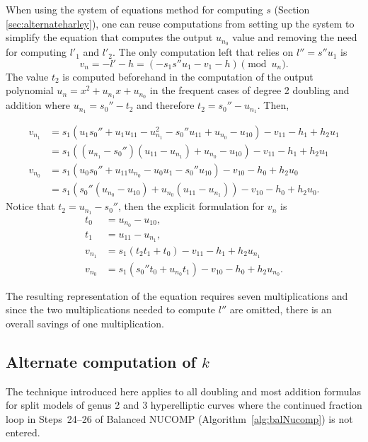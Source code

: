 When using the system of equations method for computing $s$ (Section
\ref{sec:alternateharley}), one can reuse computations from setting up the
system to simplify the equation that computes the output $u_{n_0}$ value and
removing the need for computing $l'_1$ and $l'_2$. The only computation left
that relies on $l'' = s''u_1$ is $$ v_n = -l' - h = (-s_1s''u_1 - v_1 - h)
\pmod{u_n}. $$ The value $t_2$ is computed beforehand in the computation of the
output polynomial $u_n = x^2 + u_{n_1}x + u_{n_0}$ in the frequent cases of
degree 2 doubling and addition where $u_{n_1} = s_0'' - t_2$ and therefore
$t_2 = s_0'' - u_{n_1}$. Then,

\begin{align*}
    v_{n_1} &= s_1(u_1s_0''+ u_1u_{11} - u_{n_1}^2 - s_0''u_{11}
    + u_{n_0} - u_{10}) - v_{11} - h_1 + h_2u_1\\
            &= s_1((u_{n_1} - s_0'')(u_{11} - u_{n_1}) + u_{n_0} - u_{10}) - v_{11} - h_1 + h_2u_1\\
    v_{n_0} &= s_1(u_0s_0'' + u_{11}u_{n_0} - u_0u_1 -s_0''u_{10}) - v_{10} - h_0 + h_2u_0\\
            &= s_1(s_0''(u_{n_0} - u_{10}) + u_{n_0}(u_{11} - u_{n_1})) - v_{10} - h_0 + h_2u_0.
\end{align*} 
Notice that $t_2 = u_{n_1} - s_0''$, then the explicit formulation for $v_n$ is 
\begin{align*}  
    t_0 &= u_{n_0} - u_{10},\\
    t_1 &= u_{11} - u_{n_1},\\
    v_{n_1} &= s_1(t_2t_1 + t_0) - v_{11} - h_1 + h_2u_{n_1}\\
    v_{n_0} &= s_1(s_0''t_0 + u_{n_0}t_1) - v_{10} - h_0 + h_2u_{n_0}.
\end{align*}

The resulting representation of the equation requires seven multiplications and
since the two multiplications needed to compute $l''$ are omitted,
there is an overall savings of one multiplication.

\subsection{Alternate computation of \texorpdfstring{$k$}{k}} 
\label{sec:alternatek}
The technique introduced here applies to all doubling and most addition
formulas for split models of genus 2 and 3 hyperelliptic curves where the
continued fraction loop in Steps~24--26 of Balanced NUCOMP
(Algorithm~\ref{alg:balNucomp}) is not entered. 


